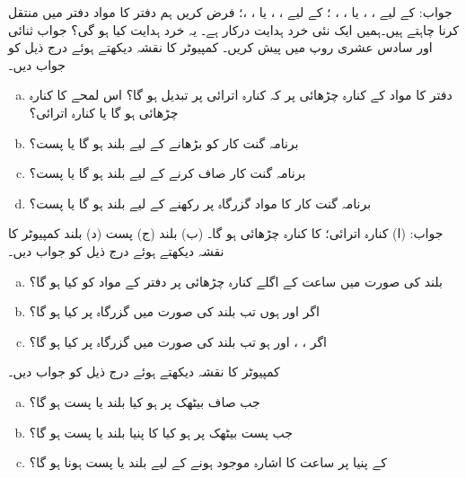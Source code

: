  جواب:
 کے لیے  ، ،   یا ، ، ؛
 کے لیے ، ،  یا ، ،؛
 فرض کریں ہم دفتر  کا مواد دفتر  میں منتقل کرنا چاہتے ہیں۔ہمیں ایک نئی  خرد ہدایت درکار ہے۔ یہ خرد ہدایت کیا ہو گی؟ جواب ثنائی اور  سادس عشری روپ میں پیش کریں۔
 کمپیوٹر کا نقشہ دیکھتے ہوئے درج ذیل کو جواب دیں۔
 \begin{enumerate}[a.]
 \item
دفتر  کا مواد   کے کنارہ چڑھائی پر کہ کنارہ اترائی پر تبدیل ہو گا؟
 اس لمحے  کا کنارہ چڑھائی ہو گا یا کنارہ اترائی؟
 \item
 برنامہ گنت کار کو بڑھانے کے لیے  بلند ہو گا یا پست؟
 \item
 برنامہ گنت کار صاف کرنے کے لیے  بلند ہو گا یا پست؟
 \item
 برنامہ گنت کار کا مواد  گزرگاہ  پر  رکھنے کے لیے  بلند ہو گا یا پست؟
 \end{enumerate}
 
 جواب: (ا) کنارہ اترائی؛  کا کنارہ چڑھائی ہو گا۔ (ب) بلند (ج) پست (د) بلند
  کمپیوٹر کا نقشہ دیکھتے ہوئے درج ذیل کو جواب دیں۔
 \begin{enumerate}[a.]
 \item
 بلند  کی صورت میں ساعت کے اگلے کنارہ چڑھائی پر  دفتر  کے مواد کو کیا ہو گا؟
 \item
 اگر  اور    ہوں تب بلند  کی صورت میں  گزرگاہ  پر کیا ہو گا؟
 \item
  اگر ،      ، اور  ہو  تب بلند  کی صورت میں  گزرگاہ  پر کیا ہو گا؟
 \end{enumerate}
  کمپیوٹر کا نقشہ دیکھتے ہوئے درج ذیل کو جواب دیں۔
  \begin{enumerate}[a.]
  \item
  جب  صاف بیٹھک پر ہو کیا  بلند یا پست ہو گا؟
  \item
  جب   پست بیٹھک پر   ہو کیا  کا پنیا  بلند یا پست ہو گا؟
  \item
   کے پنیا  پر ساعت  کا اشارہ موجود ہونے کے لیے  بلند یا پست ہونا ہو گا؟
  \end{enumerate}
  
